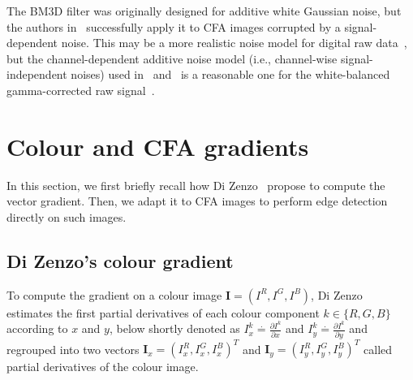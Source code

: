 \documentclass[twoside]{article}
\begin{document}
The BM3D filter was originally designed for additive white Gaussian noise, but the authors in~\cite{danielyan_lnla_2009} successfully apply it to CFA images corrupted by a signal-dependent noise. This may be a more realistic noise model for digital raw data~\cite{seybold_ism_2013}, but the channel-dependent additive noise model (i.e., channel-wise signal-independent noises) used in~\cite{zhang_ip_2009} and~\cite{akiyama_icip_2015} is a reasonable one for the white-balanced gamma-corrected raw signal~\cite{jeon_ip_2013}.



\section{Colour and CFA gradients}
\label{sec:gradients}

In this section, we first briefly recall how Di Zenzo~\cite{zenzo_cvgip_1986} propose to compute the vector gradient. Then, we adapt it to CFA images to perform edge detection directly on such images.


\subsection{Di Zenzo's colour gradient}
\label{subsec:colour_gradient}

To compute the gradient on a colour image $\mathbf{I}=\left(I^R,I^G,I^B\right)$, Di Zenzo~\cite{zenzo_cvgip_1986} estimates the first partial derivatives of each colour component $k \in \{R,G,B\}$ according to $x$ and $y$, below shortly denoted as $I^k_x \stackrel{\cdot}{=} \frac{\partial I^k}{\partial x}$ and $I_y^k \stackrel{\cdot}{=} \frac{\partial I^k}{\partial y}$ and regrouped into two vectors $\mathbf{I}_x = \left( I^R_x, I^G_x, I^B_x \right) ^T$ and $\mathbf{I}_y = \left( I^R_y, I^G_y, I^B_y \right) ^T$ called partial derivatives of the colour image. 


\end{document}
